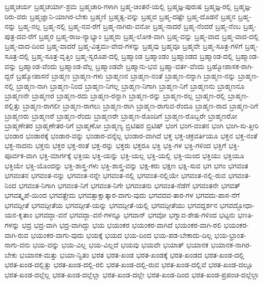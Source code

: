 {ಬ್ರಹ್ಮಚರ್ಯ
ಬ್ರಹ್ಮಚರ್ಯಾ-ಶ್ರಮ
ಬ್ರಹ್ಮಚಾರಿ-ಗಳಾಗಿ
ಬ್ರಹ್ಮ-ಚಿಂತನೆ-ಯಲ್ಲಿ
ಬ್ರಹ್ಮಜ್ಞ-ಪುರುಷ
ಬ್ರಹ್ಮಜ್ಞ-ರಲ್ಲಿ
ಬ್ರಹ್ಮಜ್ಞ-ರಿರು-ವರು
ಬ್ರಹ್ಮಜ್ಞಾನಿ-ಯಾಗಿರ-ಬೇಕು
ಬ್ರಹ್ಮಣಿ
ಬ್ರಹ್ಮತ್ವ-ವನ್ನು
ಬ್ರಹ್ಮದ
ಬ್ರಹ್ಮ-ದಷ್ಟೇ
ಬ್ರಹ್ಮ-ದೊಡನೆ
ಬ್ರಹ್ಮನ
ಬ್ರಹ್ಮ-ನನ್ನು
ಬ್ರಹ್ಮ-ನಲ್ಲ
ಬ್ರಹ್ಮ-ನಲ್ಲಿ
ಬ್ರಹ್ಮ-ನವ-ರೆಗೆ
ಬ್ರಹ್ಮ-ನಾಗಿರು-ವನೋ
ಬ್ರಹ್ಮ-ನಾದರೆ
ಬ್ರಹ್ಮ-ನೆಂದರೆ
ಬ್ರಹ್ಮ-ನೆಂಬ
ಬ್ರಹ್ಮ-ಪುತ್ರ-ದವ-ರೆಗೆ
ಬ್ರಹ್ಮರ
ಬ್ರಹ್ಮ-ರಾಜ-ನ್ಯಾಭ್ಯಾಂ
ಬ್ರಹ್ಮರು
ಬ್ರಹ್ಮ-ಲೋಕ-ವಾಗಿ
ಬ್ರಹ್ಮ-ವನ್ನು
ಬ್ರಹ್ಮ-ವಾದ
ಬ್ರಹ್ಮ-ವಾದ-ದಲ್ಲಿ
ಬ್ರಹ್ಮ-ವಾದ-ದಿಂದ
ಬ್ರಹ್ಮ-ವಾದರೆ
ಬ್ರಹ್ಮ-ವಿತ್ತಮಃ-ವೇದ-ಗಳನ್ನು
ಬ್ರಹ್ಮವು
ಬ್ರಹ್ಮವೂ
ಬ್ರಹ್ಮವೇ
ಬ್ರಹ್ಮ-ಸೂತ್ರ-ಗಳಿಗೆ
ಬ್ರಹ್ಮ-ಸೂತ್ರ-ದಲ್ಲಿ
ಬ್ರಹ್ಮ-ಸೂತ್ರ-ವೃತ್ತಿಂ
ಬ್ರಹ್ಮ-ಸ್ವರೂಪ-ದಲ್ಲಿ
ಬ್ರಹ್ಮಾಂಡ
ಬ್ರಹ್ಮಾಂಡಂ
ಬ್ರಹ್ಮಾಂಡದ
ಬ್ರಹ್ಮಾಂಡ-ದಲ್ಲಿ
ಬ್ರಹ್ಮಾಂಡ-ವನ್ನು
ಬ್ರಹ್ಮಾಂಡ-ವೆಂದು
ಬ್ರಹ್ಮಾಂಡ-ವೆಲ್ಲ
ಬ್ರಹ್ಮಾಂಡವೇ
ಬ್ರಹ್ಮಾನು-ಭವ
ಬ್ರಹ್ಮಾ-ವರ್ತ-ವೆಂದು
ಬ್ರಹ್ಮೋಪಾಸಕ-ರಾಗಿ-ದ್ದರೆ
ಬ್ರಹ್ಮೋಪಾಸನೆ
ಬ್ರಾಹ್ಮಣ
ಬ್ರಾಹ್ಮಣ-ಗಳು
ಬ್ರಾಹ್ಮಣನ
ಬ್ರಾಹ್ಮಣ-ನಂತೆ
ಬ್ರಾಹ್ಮಣ-ನನ್ನಾಗಿ
ಬ್ರಾಹ್ಮಣ-ನನ್ನು
ಬ್ರಾಹ್ಮಣ-ನಲ್ಲಿ
ಬ್ರಾಹ್ಮಣ-ನಾಗಿ
ಬ್ರಾಹ್ಮಣ-ನಿಂದ
ಬ್ರಾಹ್ಮಣ-ನಿಗಲ್ಲ
ಬ್ರಾಹ್ಮಣ-ನಿಗಾಗಿ
ಬ್ರಾಹ್ಮಣ-ನಿಗೆ
ಬ್ರಾಹ್ಮಣನು
ಬ್ರಾಹ್ಮಣನೂ
ಬ್ರಾಹ್ಮಣನೇ
ಬ್ರಾಹ್ಮಣರ
ಬ್ರಾಹ್ಮಣ-ರದು
ಬ್ರಾಹ್ಮಣ-ರನ್ನಾಗಿ
ಬ್ರಾಹ್ಮಣ-ರನ್ನು
ಬ್ರಾಹ್ಮಣ-ರಲ್ಲ
ಬ್ರಾಹ್ಮಣ-ರಲ್ಲಿ
ಬ್ರಾಹ್ಮಣ-ರಲ್ಲಿತ್ತು
ಬ್ರಾಹ್ಮಣ-ರಾಗಲೀ
ಬ್ರಾಹ್ಮಣ-ರಾಗಲು
ಬ್ರಾಹ್ಮಣ-ರಾಗಿ
ಬ್ರಾಹ್ಮಣ-ರಾಗುವ-ರೆಂದೂ
ಬ್ರಾಹ್ಮಣ-ರಾದ
ಬ್ರಾಹ್ಮಣ-ರಿಗೆ
ಬ್ರಾಹ್ಮಣರು
ಬ್ರಾಹ್ಮಣರೆ
ಬ್ರಾಹ್ಮಣ-ರೆಂದು
ಬ್ರಾಹ್ಮಣರೇ
ಬ್ರಾಹ್ಮಣ-ರೊಂದಿಗೆ
ಬ್ರಾಹ್ಮಣ-ರೊಬ್ಬರೇ
ಬ್ರಾಹ್ಮಣರೋ
ಬ್ರಾಹ್ಮಣೇತರ
ಬ್ರಾಹ್ಮಣೇತರ-ರಿಗೆ
ಬ್ರಾಹ್ಮಣೋ
ಬ್ರಾಹ್ಮಣ್ಯ
ಬ್ರಿಟಿಷರ
ಬ್ರಿಟಿಷ್
ಭಂಗ
ಭಂಗ-ವಂತನ
ಭಂಗಿ
ಭಂಗಿ-ಸು-ತ್ತೀರಿ
ಭಂಡಾರ
ಭಂಡಾರಕ್ಕೆ
ಭಂಡಾರ-ವನ್ನು
ಭಂಡಾರ-ವನ್ನೆಲ್ಲ
ಭಂಡಾರ-ವಾಗಿದೆ
ಭಕ್ತ
ಭಕ್ತ-ಚಕ್ರವರ್ತಿಯೂ
ಭಕ್ತನ
ಭಕ್ತ-ನಂತೆ
ಭಕ್ತ-ನಾದನು
ಭಕ್ತನು
ಭಕ್ತರ
ಭಕ್ತ-ರಂತೆ
ಭಕ್ತ-ರನ್ನು
ಭಕ್ತರು
ಭಕ್ತರೂ
ಭಕ್ತಿ
ಭಕ್ತಿ-ಗಳ
ಭಕ್ತಿ-ಗಳಿಂದ
ಭಕ್ತಿಗೆ
ಭಕ್ತಿ-ಪೂರ್ವಕ-ವಾಗಿ
ಭಕ್ತಿ-ಮಾರ್ಗಕ್ಕೆ
ಭಕ್ತಿಯ
ಭಕ್ತಿ-ಯನ್ನು
ಭಕ್ತಿ-ಯಲ್ಲ
ಭಕ್ತಿ-ಯಲ್ಲಿ
ಭಕ್ತಿ-ಯಿಂದ
ಭಕ್ತಿಯು
ಭಕ್ತಿಯೂ
ಭಕ್ತಿಯೇ
ಭಕ್ತಿ-ಯೊಂದನ್ನು
ಭಕ್ತಿ-ಶಾಸ್ತ್ರ-ಗಳು
ಭಕ್ತಿ-ಶಾಸ್ತ್ರ-ವನ್ನು
ಭಕ್ಷ-ಕರು
ಭಕ್ಷಣ
ಭಕ್ಷಿ-ಸುವ
ಭಗ
ಭಗಂ
ಭಗವಂತ
ಭಗವಂತನ
ಭಗವಂತ-ನನ್ನು
ಭಗವಂತ-ನನ್ನೇ
ಭಗವಂತ-ನಲ್ಲಿ
ಭಗವಂತ-ನಲ್ಲಿಯೇ
ಭಗವಂತ-ನಲ್ಲಿ-ರುವ
ಭಗವಂತ-ನಿಂದ
ಭಗವಂತ-ನಿಗಾಗಿ
ಭಗವಂತ-ನಿಗೆ
ಭಗವಂತ-ನಿಗೇ
ಭಗವಂತನು
ಭಗವಂತ-ನೆಡೆಗೆ
ಭಗವಂತನೇ
ಭಗವತ್
ಭಗವತ್ಕೃಪೆ-ಯಿಂದ
ಭಗವತ್ಪ್ರೇಮ
ಭಗವತ್ಸಾಕ್ಷಾತ್ಕಾರ-ವಾಗು-ವುದು
ಭಗವದವ-ತಾರ-ಗಳ
ಭಗವದು-ಪಾಸ-ನೆಗೆ
ಭಗವದ್ಗೀತೆ
ಭಗವದ್ಗೀತೆಯ
ಭಗವದ್ಗೀತೆ-ಯನ್ನು
ಭಗವದ್ಗೀತೆ-ಯಲ್ಲಿ
ಭಗವದ್ಗೀತೆಯು
ಭಗವದ್ದರ್ಶನ
ಭಗವದ್ಬೋಧಾ-ಯನ-ಕೃತಾಂ
ಭಗವದ್ಭಾ-ವನೆ
ಭಗವದ್ಭಾ-ವನೆ-ಗಳನ್ನೂ
ಭಗವಾನ್
ಭಗವೋ
ಭಗ್ನಾವ-ಶೇಷ-ಗಳಿಂದ
ಭಟ್ಟನು
ಭಣತಿ-ಗಳನ್ನು
ಭದ್ರ
ಭದ್ರ-ವಾಗಿ
ಭದ್ರ-ವಾಗಿದ್ದು
ಭಯ
ಭಯಂಕರ
ಭಯಂಕರ-ವಾಗಿದೆ
ಭಯಂಕರ-ವಾಗಿ-ರಲಿ
ಭಯಂಕರ-ವಾಗಿ-ರುವ
ಭಯಂಕರ-ವಾಗು-ವುದು
ಭಯಕ್ಕೆ
ಭಯದ
ಭಯ-ದಿಂದ
ಭಯ-ಪಡ-ಬೇಕಾದು-ದಿಲ್ಲ
ಭಯ-ಭ್ರಾಂತ-ನಾಗು-ವನು
ಭಯ-ವನ್ನು 
ಭಯ-ವಿಲ್ಲ
ಭಯ-ವಿಲ್ಲದೆ
ಭಯವು
ಭಯವೇ
ಭಯಾತ್
ಭಯಾನಕ
ಭಯಾನಕ-ನಾಗಿರ-ಬೇಕು
ಭಯಾನಕ-ಮತ್ತು
ಭಯಾ-ನ್ವಿತಂ
ಭರತ
ಭರತ-ಖಂಡ
ಭರತ-ಖಂಡಕ್ಕೆ
ಭರತ-ಖಂಡದ
ಭರತ-ಖಂಡ-ದಲ್ಲಿ
ಭರತ-ಖಂಡ-ದಲ್ಲಿತ್ತು
ಭರತ-ಖಂಡ-ದಲ್ಲಿ-ರಲಿ
ಭರತ-ಖಂಡ-ದಲ್ಲಿ-ರುವ
ಭರತ-ಖಂಡ-ದಲ್ಲಿವೆ
ಭರತ-ಖಂಡ-ದಲ್ಲೂ
ಭರತ-ಖಂಡ-ದಲ್ಲೆಲ್ಲ
ಭರತ-ಖಂಡ-ದಲ್ಲೆಲ್ಲಾ
ಭರತ-ಖಂಡ-ದಲ್ಲೇ
ಭರತ-ಖಂಡ-ದಿಂದ
ಭರತ-ಖಂಡ-ಪ್ರಪಂಚ-ದಲ್ಲೆಲ್ಲಾ
}
